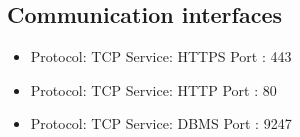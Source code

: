 \subsection{Communication interfaces}
\begin{itemize}
	\item Protocol: TCP Service: HTTPS Port : 443
	\item Protocol: TCP Service: HTTP  Port : 80
	\item Protocol: TCP Service: DBMS  Port : 9247
\end{itemize}
